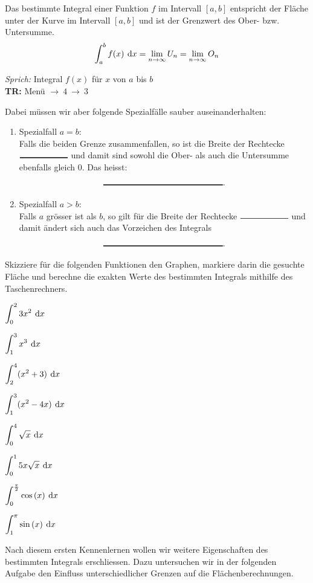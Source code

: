 \documentclass[11pt,oneside]{article}
\begin{document}
	\begin{definition}
		Das bestimmte Integral einer Funktion $f$ im Intervall $\left[a,b\right]$ entspricht der Fläche unter der Kurve im Intervall $\left[a,b\right]$ und ist der Grenzwert des Ober- bzw. Untersumme.
		\[\int_a^b f(x)\:\operatorname{d}\!{x}=\lim_{n\rightarrow\infty}U_n=\lim_{n\rightarrow\infty}O_n\]

		\textit{Sprich:} Integral $f(x)$ für $x$ von $a$ bis $b$\\
		\textbf{TR:} Menü $\to\:4\:\to\:3$
	\end{definition}
	Dabei müssen wir aber folgende Spezialfälle sauber auseinanderhalten:
	\begin{enumerate}[label=\Alph*)]
		\item Spezialfall $a=b$:\\ Falls die beiden Grenze zusammenfallen, so ist die Breite der Rechtecke $\gap{2}$ und damit sind sowohl die Ober- als auch die Untersumme ebenfalls gleich $0$. Das heisst: \[\gap{5}.\]
		\item Spezialfall $a>b$:\\ Falls $a$ grösser ist als $b$, so gilt für die Breite der Rechtecke $\gap{2}$ und damit ändert sich auch das Vorzeichen des Integrals \[\gap{5}.\]
	\end{enumerate}
	\begin{aufgabe}
		Skizziere für die folgenden Funktionen den Graphen, markiere darin die gesuchte Fläche und berechne die exakten Werte des bestimmten Integrals mithilfe des Taschenrechners.
		\begin{enumcols}[4]
			\item $\displaystyle\int_0^2 3x^2\:\operatorname{d}\!{x}$
			\item $\displaystyle\int_1^3 x^3\:\operatorname{d}\!{x}$
			\item $\displaystyle\int_2^4(x^2+3)\:\operatorname{d}\!{x}$
			\item $\displaystyle\int_1^3(x^2-4x)\:\operatorname{d}\!{x}$
			\item $\displaystyle\int_0^4 \sqrt{x}\:\operatorname{d}\!{x}$
			\item $\displaystyle\int_0^1 5x\sqrt{x}\:\operatorname{d}\!{x}$
			\item $\ds\int_0^\frac{\pi}{2}\cos{x}\d{x}$
			\item $\ds\int_1^\pi\sin{x}\d{x}$
		\end{enumcols}
	\end{aufgabe}
	Nach diesem ersten Kennenlernen wollen wir weitere Eigenschaften des bestimmten Integrals erschliessen. Dazu untersuchen wir in der folgenden Aufgabe den Einfluss unterschiedlicher Grenzen auf die Flächenberechnungen.
\end{document}
